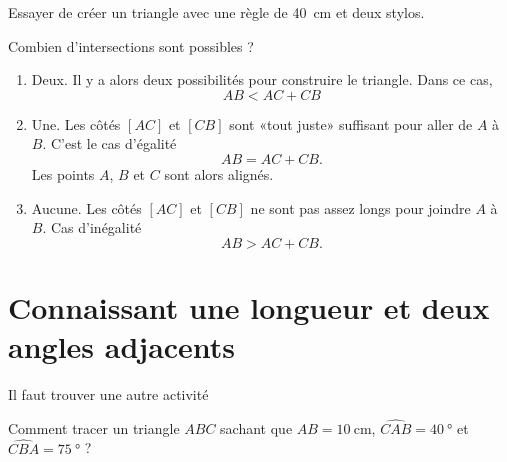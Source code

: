 \begin{example}
    Essayer de créer un triangle avec une règle de \SI{40}{\centi\meter} et deux stylos.
\end{example}

Combien d'intersections sont possibles ?
\begin{enumerate}
    \item
        Deux. Il y a alors deux possibilités pour construire le triangle. Dans ce cas,
        \begin{equation}
            AB<AC+CB
        \end{equation}
    \item
        Une. Les côtés \( [AC]\) et \( [CB]\) sont «tout juste» suffisant pour aller de \( A\) à \( B\). C'est le cas d'égalité
        \begin{equation}
            AB=AC+CB.
        \end{equation}
        Les points \( A\), \( B\) et \( C\) sont alors alignés.
    \item 
        Aucune. Les côtés \( [AC]\) et \( [CB]\) ne sont pas assez longs pour joindre \( A\) à \( B\). Cas d'inégalité
        \begin{equation}
            AB>AC+CB.
        \end{equation}
\end{enumerate}

\section{Connaissant une longueur et deux angles adjacents}

{\large Il faut trouver une autre activité}

Comment tracer un triangle \( ABC\) sachant que \( AB=\SI{10}{\centi\meter}\), \( \widehat{CAB}=\SI{40}{\degree}\) et \( \widehat{CBA}=\SI{75}{\degree}\) ?

